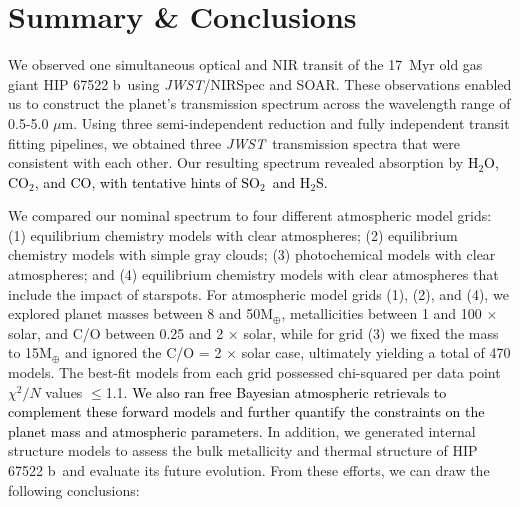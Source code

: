 \documentclass[twocolumn]{aastex63} %
\newcommand{\water}{H$_2$O}
\newcommand{\jwst}{\textit{JWST}}
\newcommand{\cotwo}{CO$_2$}
\newcommand{\sotwo}{SO$_2$}
\newcommand{\plname}{HIP 67522 b}
\newcommand{\newedit}[1]{\textcolor{black}{#1}}
\begin{document}
\section{Summary \& Conclusions} \label{sec:summary}

We observed one simultaneous optical and NIR transit of the 17~Myr old gas giant \plname\ using \jwst/NIRSpec and SOAR. These observations enabled us to construct the planet's transmission spectrum across the wavelength range of 0.5-5.0 $\mu$m. Using three semi-independent reduction and fully independent transit fitting pipelines, we obtained three \jwst\, transmission spectra that were consistent with each other. Our resulting spectrum revealed absorption by \newedit{\water, \cotwo, and CO, with tentative hints of \sotwo\ and H$_2$S.} 

We compared our nominal spectrum to four different atmospheric model grids: (1) equilibrium chemistry models with clear atmospheres; (2) equilibrium chemistry models with simple gray clouds; (3) photochemical models with clear atmospheres; and (4) equilibrium chemistry models with clear atmospheres that include the impact of starspots. For atmospheric model grids (1), (2), and (4), we explored planet masses between 8 and 50M$_{\oplus}$, metallicities between 1 and 100 $\times$ solar, and C/O between 0.25 and 2 $\times$ solar, while for grid (3) we fixed the mass to 15M$_{\oplus}$ and ignored the C/O = 2 $\times$ solar case, ultimately yielding a total of 470 models. The best-fit models from each grid possessed chi-squared per data point $\chi^{2}/N$ values $\leq$1.1. \newedit{We also ran free Bayesian atmospheric retrievals to complement these forward models and further quantify the constraints on the planet mass and atmospheric parameters.} In addition, we generated internal structure models to assess the bulk metallicity and thermal structure of \plname\ and evaluate its future evolution. From these efforts, we can draw the following conclusions: 
\end{document}
